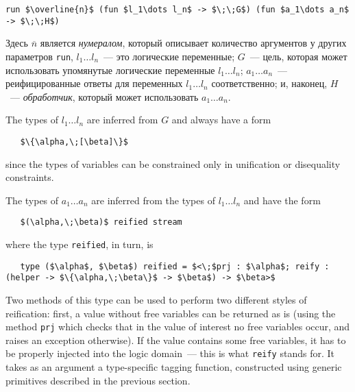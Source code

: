 \begin{lstlisting}[mathescape=true]
   run $\overline{n}$ (fun $l_1\dots l_n$ -> $\;\;G$) (fun $a_1\dots a_n$ -> $\;\;H$)
\end{lstlisting}

\noindent Здесь $\overline{n}$ является \emph{нумералом}, который описывает количество аргументов у других параметров \lstinline|run|,
\mbox{$l_1\dots l_n$}~--- это логические переменные;
$G$~--- цель, которая может использовать упомянутые логические переменные \mbox{$l_1\dots l_n$};
\mbox{$a_1\dots a_n$}~---  реифицированные ответы для переменных \mbox{$l_1\dots l_n$} соответственно; и,
наконец, $H$~--- \emph{обработчик}, который может использовать \mbox{$a_1\dots a_n$}.



The types of \mbox{$l_1\dots l_n$} are inferred from $G$ and always have a form

\begin{lstlisting}
   $\{\alpha,\;[\beta]\}$
\end{lstlisting}

\noindent since the types of variables can be constrained only in unification or disequality constraints.

The types of \mbox{$a_1\dots a_n$} are inferred from the types of \mbox{$l_1\dots l_n$} and
have the form

\begin{lstlisting}
   $(\alpha,\;\beta)$ reified stream
\end{lstlisting}

\noindent where the type \lstinline|reified|, in turn, is

\begin{lstlisting}
   type ($\alpha$, $\beta$) reified = $<\;$prj : $\alpha$; reify : (helper -> $\{\alpha,\;\beta\}$ -> $\beta$) -> $\beta>$
\end{lstlisting}

Two methods of this type can be used to perform two different styles of reification: first, a value without
free variables can be returned as is (using the method \lstinline|prj| which checks that in the value of
interest no free variables occur, and raises an exception otherwise). If the value contains some free
variables, it has to be properly injected into the logic domain~--- this is what \lstinline|reify| stands
for. It takes as an argument a type-specific tagging function, constructed using generic
primitives described in the previous section.

